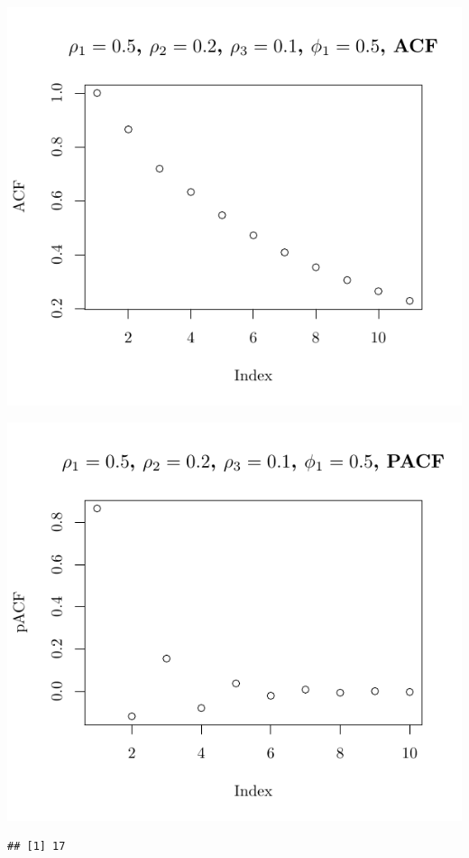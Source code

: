 \documentclass[10pt]{paper}\usepackage[]{graphicx}\usepackage[]{color}
\makeatletter
\def\maxwidth{ %
  \ifdim\Gin@nat@width>\linewidth
    \linewidth
  \else
    \Gin@nat@width
  \fi
}
\newenvironment{kframe}{%
 \def\at@end@of@kframe{}%
 \ifinner\ifhmode%
  \def\at@end@of@kframe{\end{minipage}}%
  \begin{minipage}{\columnwidth}%
 \fi\fi%
 \def\FrameCommand##1{\hskip\@totalleftmargin \hskip-\fboxsep
 \colorbox{shadecolor}{##1}\hskip-\fboxsep
     \hskip-\linewidth \hskip-\@totalleftmargin \hskip\columnwidth}%
 \MakeFramed {\advance\hsize-\width
   \@totalleftmargin\z@ \linewidth\hsize
   \@setminipage}}%
 {\par\unskip\endMakeFramed%
 \at@end@of@kframe}
\newenvironment{knitrout}{}{} %
\makeatother
\begin{document}
\begin{knitrout}
{\centering \includegraphics[width=\maxwidth]{figure/graphics-plotter-143} 

}




{\centering \includegraphics[width=\maxwidth]{figure/graphics-plotter-144} 

}


\begin{kframe}\begin{verbatim}
## [1] 17
\end{verbatim}
\end{kframe}


\end{knitrout}
\end{document}
